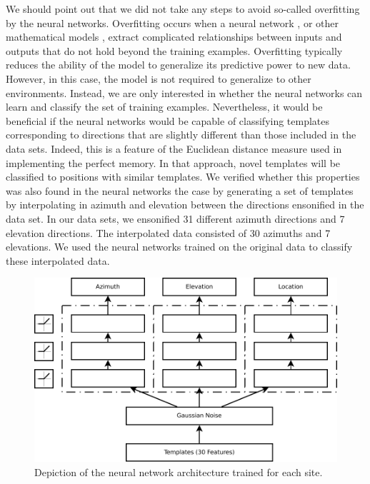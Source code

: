 \documentclass[preprint,5p]{elsarticle}
\begin{document}
We should point out that we did not take any steps to avoid so-called overfitting by the neural networks. Overfitting occurs when a neural network \citep{Ghotra2017}, or other mathematical models \citep{Hawkins2004}, extract complicated relationships between inputs and outputs that do not hold beyond the training examples. Overfitting typically reduces the ability of the model to generalize its predictive power to new data. However, in this case, the model is not required to generalize to other environments. Instead, we are only interested in whether the neural networks can learn and classify the set of training examples. Nevertheless, it would be beneficial if the neural networks would be capable of classifying templates corresponding to directions that are slightly different than those included in the data sets. Indeed, this is a feature of the Euclidean distance measure used in implementing the perfect memory. In that approach, novel templates will be classified to positions with similar templates. We verified whether this properties was also found in the neural networks the case by generating a set of templates by interpolating in azimuth and elevation between the directions ensonified in the data set. In our data sets, we ensonified 31 different azimuth directions and 7 elevation directions. The interpolated data consisted of 30 azimuths and 7 elevations. We used the neural networks trained on the original data to classify these interpolated data. 

\begin{figure}
	\centering
	\includegraphics[width=1\linewidth]{figures/networks}
	\caption{Depiction of the neural network architecture trained for each site.}
	\label{fig:networks}
\end{figure}
\end{document}
